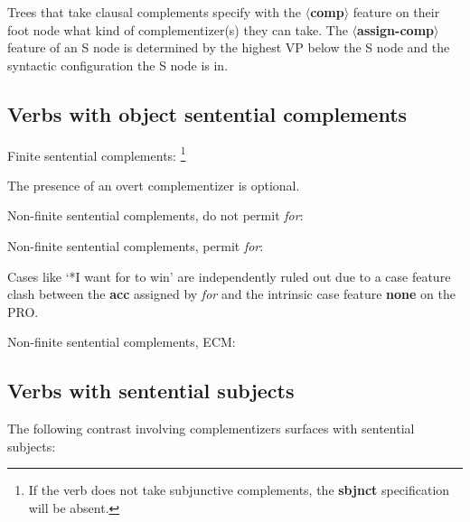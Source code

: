 Trees that take clausal complements specify with the {\bf $\langle$comp$\rangle$} feature
on their foot node what kind of complementizer(s) they can take. 
The {\bf $\langle$assign-comp$\rangle$} feature of an S node is determined 
by the highest VP below the S node and the syntactic configuration
the S node is in. 

\subsection{Verbs with object sentential complements}
Finite sentential complements:
\footnote{
If the verb does not take subjunctive complements, the {\bf sbjnct}
specification will be absent.
}


The presence of an overt complementizer is optional.

Non-finite sentential complements, do not permit {\em for}:


Non-finite sentential complements, permit {\em for}:


Cases like `*I want for to win' are independently ruled out due to a 
case feature clash between the {\bf acc} assigned by {\em for} and the
intrinsic case feature {\bf none} on the PRO.

Non-finite sentential complements, ECM:



\subsection{Verbs with sentential subjects}
The following contrast involving complementizers surfaces with sentential
subjects:

